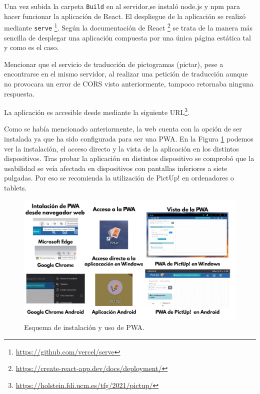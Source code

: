 Una vez subida la carpeta \texttt{Build} en al servidor,se instaló \texttt{}node.js y npm para hacer funcionar la aplicación de React. El despliegue de la aplicación se realizó mediante \texttt{serve} \footnote{\url{https://github.com/vercel/serve}}. Según la documentación de React \footnote{\url{https://create-react-app.dev/docs/deployment/}} se trata de la manera más sencilla de desplegar una aplicación compuesta por una única página estática tal y como es el caso. 

Mencionar que el servicio de traducción de pictogramas (pictar), pese a encontrarse en el mismo servidor, al realizar una petición de traducción aunque no provocara un error de CORS visto anteriormente, tampoco retornaba ninguna respuesta. 

La aplicación es accesible desde mediante la siguiente URL\footnote{\url{https://holstein.fdi.ucm.es/tfg/2021/pictup/}}.

Como se había mencionado anteriormente, la web cuenta con la opción de ser instalada ya que ha sido configurada para ser una PWA. En la Figura \ref{fig:pwa} podemos ver la instalación, el acceso directo y la vista de la aplicación en los distintos dispositivos. Tras probar la aplicación en distintos dispositivo se comprobó que la usabilidad se veía afectada en dispositivos con pantallas inferiores a siete pulgadas. Por eso se recomienda la utilización de PictUp! en ordenadores o tablets.

\begin{figure}[h!]
	\centering
	\includegraphics[width=\linewidth]{Imagenes/Bitmap/pwa}
	\caption{Esquema de instalación y uso de PWA. }
	\label{fig:pwa}
\end{figure}










